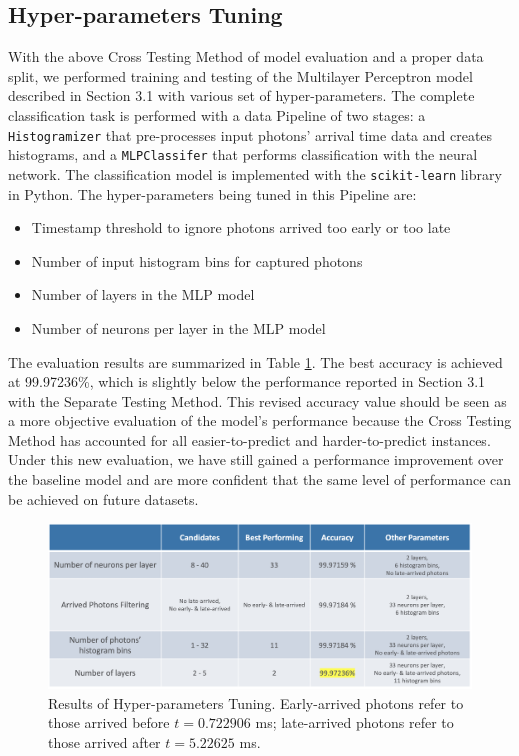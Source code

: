 \documentclass[letterpaper,twocolumn,10pt]{article}
\begin{document}
\subsection{Hyper-parameters Tuning}

With the above Cross Testing Method of model evaluation and a proper data split, we performed training and testing of the Multilayer Perceptron model described in Section 3.1 with various set of hyper-parameters. The complete classification task is performed with a data Pipeline of two stages: a \texttt{Histogramizer} that pre-processes input photons' arrival time data and creates histograms, and a \texttt{MLPClassifer} that performs classification with the neural network. The classification model is implemented with the \texttt{scikit-learn} library in Python. The hyper-parameters being tuned in this Pipeline are:

\begin{itemize}
    \item Timestamp threshold to ignore photons arrived too early or too late
    \item Number of input histogram bins for captured photons
    \item Number of layers in the MLP model
    \item Number of neurons per layer in the MLP model
\end{itemize}

The evaluation results are summarized in Table \ref{table:params_tuning}. The best accuracy is achieved at 99.97236\%, which is slightly below the performance reported in Section 3.1 with the Separate Testing Method. This revised accuracy value should be seen as a more objective evaluation of the model's performance because the Cross Testing Method has accounted for all easier-to-predict and harder-to-predict instances. Under this new evaluation, we have still gained a performance improvement over the baseline model and are more confident that the same level of performance can be achieved on future datasets. 

\begin{figure}[]
    \includegraphics[width=2\columnwidth]{Figures/params_tuning.png}
    \centering
    \caption{Results of Hyper-parameters Tuning. Early-arrived photons refer to those arrived before $t = 0.722906$ ms; late-arrived photons refer to those arrived after $t = 5.22625$ ms.}
    \label{table:params_tuning}
\end{figure}
\end{document}
